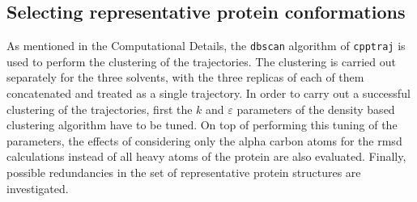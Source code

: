 \subsection{Selecting representative protein conformations}
As mentioned in the Computational Details, the \texttt{dbscan} algorithm of \texttt{cpptraj} is used to perform the clustering of the trajectories.
The clustering is carried out separately for the three solvents, with the three replicas of each of them concatenated and treated as a single trajectory.
In order to carry out a successful clustering of the trajectories, first the $k$ and $\varepsilon$ parameters of the density based clustering algorithm have to be tuned.
On top of performing this tuning of the parameters, the effects of considering only the alpha carbon atoms for the \gls{rmsd} calculations instead of all heavy atoms of the protein are also evaluated.
Finally, possible redundancies in the set of representative protein structures are investigated.

